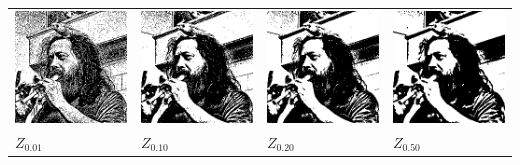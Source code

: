 \begin{tabular}{llll}
	\includegraphics{weiro-z01.png} &
	\includegraphics{weiro-z10.png} &
	\includegraphics{weiro-z20.png} &
	\includegraphics{weiro-z50.png} \\
	$Z_{0.01}$ &
	$Z_{0.10}$ &
	$Z_{0.20}$ &
	$Z_{0.50}$
\end{tabular}


